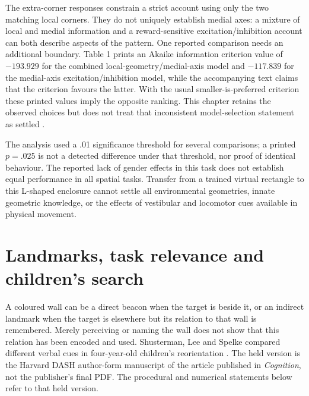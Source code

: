 The extra-corner responses constrain a strict account using only
the two matching local corners. They do not uniquely establish
medial axes: a mixture of local and medial information and a
reward-sensitive excitation/inhibition account can both describe
aspects of the pattern.
One reported comparison needs an additional boundary.
Table 1 prints an Akaike information criterion value of
\(-193.929\) for the combined local-geometry/medial-axis model and
\(-117.839\) for the medial-axis excitation/inhibition model,
while the accompanying text claims that the criterion favours the
latter. With the usual smaller-is-preferred criterion these printed
values imply the opposite ranking.
This chapter retains the observed choices but does not treat that
inconsistent model-selection statement as settled
\cite[Fig.\ 5 and Table 1]{AmbostaEtAl2013ReorientationSPU}.

The analysis used a .01 significance threshold for several
comparisons; a printed \(p=.025\) is not a detected difference
under that threshold, nor proof of identical behaviour.
The reported lack of gender effects in this task does not establish
equal performance in all spatial tasks.
Transfer from a trained virtual rectangle to this L-shaped enclosure
cannot settle all environmental geometries, innate geometric
knowledge, or the effects of vestibular and locomotor cues available
in physical movement.

\section{Landmarks, task relevance and children's search}
\label{sec:p19-spu-landmarks}

A coloured wall can be a direct beacon when the target is beside it,
or an indirect landmark when the target is elsewhere but its relation
to that wall is remembered. Merely perceiving or naming the wall
does not show that this relation has been encoded and used.
Shusterman, Lee and Spelke compared different verbal cues in
four-year-old children's reorientation
\cite{ShustermanEtAl2011NavigationDASHSPU}.
The held version is the Harvard DASH author-form manuscript of
the article published in \emph{Cognition}, not the publisher's
final PDF. The procedural and numerical statements below refer
to that held version.

